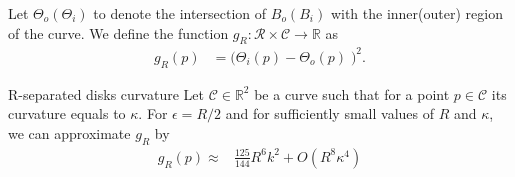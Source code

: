 Let $\Theta_o (\Theta_i)$ to denote the intersection of $B_o(B_i)$ with the inner(outer) region of the curve. We define the function $g_R:\mathcal{R} \times \mathcal{C}\rightarrow \mathbb{R}$ as
\begin{align*}
	g_{R}(p) &= \Big( \Theta_i(p) - \Theta_o(p) \;\Big)^2.
\end{align*}
%
\begin{proposition}{R-separated disks curvature}\label{app1:proposition:r-separated-disks}
 Let $\mathcal{C} \in \mathbb{R}^2$ be a curve such that for a point $p \in \mathcal{C}$ its curvature equals to $\kappa$. For $\epsilon=R/2$ and for sufficiently small values of $R$ and $\kappa$, we can approximate $g_R$ by
\begin{align*}
g_R(p) \approx & \frac{125}{144}R^6k^2 + O(R^{8}\kappa^4)
\end{align*} 
%
\end{proposition}


